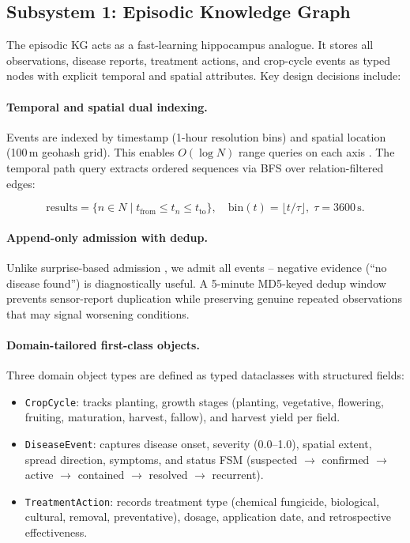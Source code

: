 \documentclass{article}
\begin{document}
\subsection{Subsystem 1: Episodic Knowledge Graph}

The episodic KG acts as a fast-learning hippocampus analogue. It stores all
observations, disease reports, treatment actions, and crop-cycle events as typed
nodes with explicit temporal and spatial attributes. Key design decisions include:

\paragraph{Temporal and spatial dual indexing.}
Events are indexed by timestamp (1-hour resolution bins) and spatial location
(100\,m geohash grid). This enables $O(\log N)$ range queries on each axis
\citep{stablepapers}. The temporal path query extracts ordered sequences via BFS
over relation-filtered edges:

\begin{equation}
\text{results} = \{n \in N \mid t_{\text{from}} \leq t_n \leq t_{\text{to}}\},
\quad \text{bin}(t) = \lfloor t / \tau \rfloor,\; \tau = 3600\,\text{s}.
\label{eq:temporal}
\end{equation}

\paragraph{Append-only admission with dedup.}
Unlike surprise-based admission \citep{titans2025}, we admit all events --
negative evidence (``no disease found'') is diagnostically useful. A 5-minute
MD5-keyed dedup window prevents sensor-report duplication while preserving genuine
repeated observations that may signal worsening conditions.

\paragraph{Domain-tailored first-class objects.}
Three domain object types are defined as typed dataclasses with structured fields:

\begin{itemize}
  \item \texttt{CropCycle}: tracks planting, growth stages (planting, vegetative,
        flowering, fruiting, maturation, harvest, fallow), and harvest yield per
        field.
  \item \texttt{DiseaseEvent}: captures disease onset, severity (0.0--1.0), spatial
        extent, spread direction, symptoms, and status FSM (suspected $\rightarrow$
        confirmed $\rightarrow$ active $\rightarrow$ contained $\rightarrow$
        resolved $\rightarrow$ recurrent).
  \item \texttt{TreatmentAction}: records treatment type (chemical fungicide,
        biological, cultural, removal, preventative), dosage, application date,
        and retrospective effectiveness.
\end{itemize}
\end{document}
